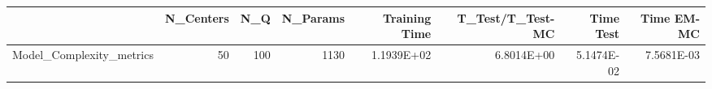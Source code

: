\begin{tabular}{lrrrrrrr}
\toprule
{} &  N\_Centers &  N\_Q &  N\_Params &  Training Time &  T\_Test/T\_Test-MC &  Time Test &  Time EM-MC \\
\midrule
Model\_Complexity\_metrics &         50 &  100 &      1130 &     1.1939E+02 &        6.8014E+00 & 5.1474E-02 &  7.5681E-03 \\
\bottomrule
\end{tabular}
